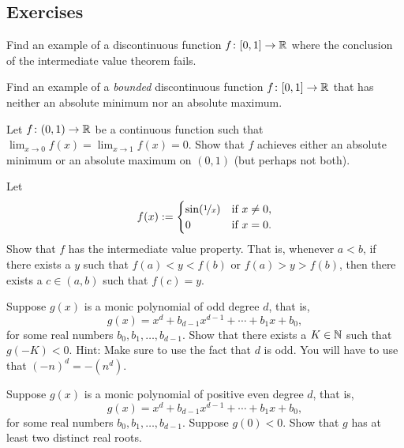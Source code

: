 \subsection{Exercises}

\begin{exercise}
Find an example of a discontinuous function $f \colon [0,1] \to {\mathbb{R}}$
where the conclusion of the intermediate value theorem fails.
\end{exercise}

\begin{exercise}
Find an example of a \emph{bounded} discontinuous function $f \colon [0,1]
\to {\mathbb{R}}$ that has neither an absolute minimum nor an absolute maximum.
\end{exercise}

\begin{exercise}
Let $f \colon (0,1) \to {\mathbb{R}}$ be a continuous function such that
$\displaystyle \lim_{x\to 0} f(x) =
\displaystyle \lim_{x\to 1} f(x) = 0$.  Show that
$f$ achieves either an absolute minimum or an absolute maximum on $(0,1)$
(but perhaps not both).
\end{exercise}

\begin{exercise} \label{exercise:meanvaluepropsin1x}
Let
\begin{equation*}
f(x) :=
\begin{cases}
\sin(\nicefrac{1}{x}) & \text{if } x \not= 0, \\
0 & \text{if } x=0.
\end{cases}
\end{equation*}
Show that $f$ has the intermediate value property.
That is, whenever $a < b$, if there exists a $y$ such that $f(a) < y < f(b)$
or $f(a) > y > f(b)$, then
there exists a $c \in (a,b)$ such that $f(c) = y$.
\end{exercise}

\begin{exercise} \label{exercise:odddegnegativeK}
Suppose $g(x)$ is a monic polynomial of odd degree $d$, that is,
\begin{equation*}
g(x) = x^d + b_{d-1} x^{d-1} + \cdots + b_1 x + b_0 ,
\end{equation*}
for some real numbers $b_{0}, b_1, \ldots, b_{d-1}$.  Show that there exists
a $K \in {\mathbb{N}}$ such that $g(-K) < 0$.  Hint: Make sure to use the fact that
$d$ is odd.  You will have to use that ${(-n)}^d = -(n^d)$.
\end{exercise}

\begin{exercise}
Suppose $g(x)$ is a monic polynomial of positive even degree $d$, that is,
\begin{equation*}
g(x) = x^d + b_{d-1} x^{d-1} + \cdots + b_1 x + b_0 ,
\end{equation*}
for some real numbers $b_{0}, b_1, \ldots, b_{d-1}$.  Suppose 
$g(0) < 0$.  Show that $g$ has at least two distinct real roots.
\end{exercise}

